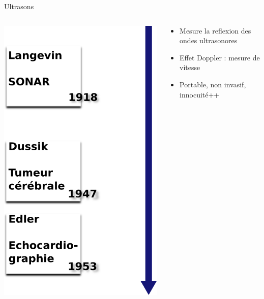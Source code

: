 \documentclass{beamer}
\begin{document}
\begin{frame}{Ultrasons}
 \begin{columns}[T]
 \begin{column}{0.5\textwidth}
 \centering
\includegraphics[height=0.7\textheight]{images/historique_us.png}
 \end{column}
 \begin{column}{0.5\textwidth}
\begin{itemize}
 \item Mesure la reflexion des ondes ultrasonores
 \item Effet Doppler : mesure de vitesse
 \item Portable, non invasif, innocuité++
\end{itemize}
 \end{column}
\end{columns} 
\end{frame}
\end{document}
